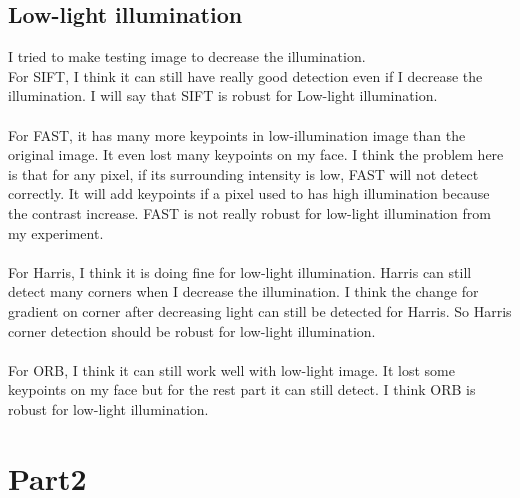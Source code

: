 \documentclass{article}
\begin{document}
\subsection*{Low-light illumination}
I tried to make testing image to decrease the illumination.\\
For SIFT, I think it can still have really good detection even if I decrease the illumination.
I will say that SIFT is robust for Low-light illumination.\\
\\
For FAST, it has many more keypoints in low-illumination image than the original image. 
It even lost many keypoints on my face. 
I think the problem here is that for any pixel, if its surrounding intensity is low, FAST will not detect correctly.
It will add keypoints if a pixel used to has high illumination because the contrast increase.
FAST is not really robust for low-light illumination from my experiment.\\
\\
For Harris, I think it is doing fine for low-light illumination.
Harris can still detect many corners when I decrease the illumination.
I think the change for gradient on corner after decreasing light can still be detected for Harris.
So Harris corner detection should be robust for low-light illumination.\\
\\
For ORB, I think it can still work well with low-light image.
It lost some keypoints on my face but for the rest part it can still detect.
I think ORB is robust for low-light illumination.
\section*{Part2}
\end{document}
